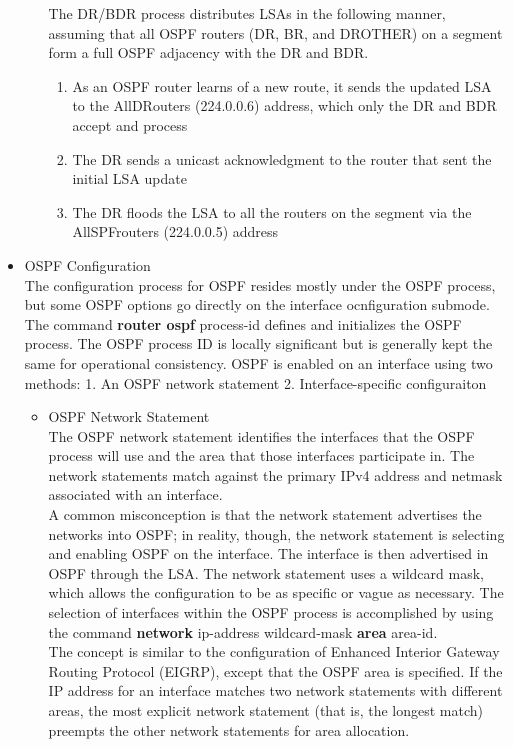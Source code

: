 \documentclass{article}
\begin{document}
\begin{itemize}
\begin{itemize}
				The DR/BDR process distributes LSAs in the following manner, assuming that all OSPF routers (DR, BR, and DROTHER) on a segment form a full OSPF adjacency with the DR and BDR.
				\begin{enumerate}
					\item As an OSPF router learns of a new route, it sends the updated LSA to the AllDRouters (224.0.0.6) address, which only the DR and BDR accept and process
					\item The DR sends a unicast acknowledgment to the router that sent the initial LSA update 
					\item The DR floods the LSA to all the routers on the segment via the AllSPFrouters (224.0.0.5) address
				\end{enumerate}
		\end{itemize}

	\item OSPF Configuration\\
		The configuration process for OSPF resides mostly under the OSPF process, but some OSPF options go directly on the interface ocnfiguration submode. The command \textbf{router ospf} process-id defines and initializes the OSPF process. The OSPF process ID is locally significant but is generally kept the same for operational consistency. OSPF is enabled on an interface using two methods: 1. An OSPF network statement 2. Interface-specific configuraiton

		\begin{itemize}
			\item OSPF Network Statement\\
				The OSPF network statement identifies the interfaces that the OSPF process will use and the area that those interfaces participate in. The network statements match against the primary IPv4 address and netmask associated with an interface.\\

				A common misconception is that the network statement advertises the networks into OSPF; in reality, though, the network statement is selecting and enabling OSPF on the interface. The interface is then advertised in OSPF through the LSA. The network statement uses a wildcard mask, which allows the configuration to be as specific or vague as necessary. The selection of interfaces within the OSPF process is accomplished by using the command \textbf{network} ip-address wildcard-mask \textbf{area} area-id.\\

				The concept is similar to the configuration of Enhanced Interior Gateway Routing Protocol (EIGRP), except that the OSPF area is specified. If the IP address for an interface matches two network statements with different areas, the most explicit network statement (that is, the longest match) preempts the other network statements for area allocation.\\


\end{itemize}
\end{itemize}
\end{document}
